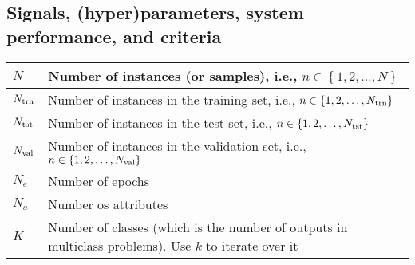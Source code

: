 \documentclass{article}
\begin{document}
\subsection{Signals, (hyper)parameters, system performance, and criteria}
\begin{xltabular}{\textwidth}{XX}
	\(N\)                                                                                                                 & Number of instances (or samples), i.e., \(n \in \left\{ 1, 2, \dots, N \right\}\)                                                                                                                                            \\ \hline
	\(N_{\textnormal{trn}}\)                                                                                              & Number of instances in the training set, i.e., \(n \in \left\{ 1, 2, \dots, N_\textnormal{trn} \right\}\)     \\ \hline
	\(N_{\textnormal{tst}}\)                                                                                              & Number of instances in the test set, i.e., \(n \in \left\{ 1, 2, \dots, N_\textnormal{tst} \right\}\)     \\ \hline
	\(N_{\textnormal{val}}\)                                                                                              & Number of instances in the validation set, i.e., \(n \in \left\{ 1, 2, \dots, N_\textnormal{val} \right\}\)     \\ \hline
	\(N_e\)                                                                                                               & Number of epochs                                                                                                                                                                                                             \\ \hline
	\(N_a\)                                                                                                               & Number os attributes                                                                                                                                                                                                         \\ \hline
	\(K\) \cite{bishopPatternRecognitionMachine2006}                                                                                                                 & Number of classes (which is the number of outputs in multiclass problems). Use \(k\) to iterate over it                                                                                                                                                                                                            \\ \hline

\end{xltabular}
\end{document}
